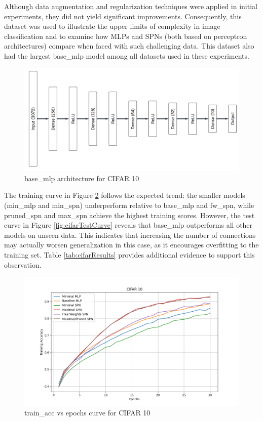 Although data augmentation and regularization techniques were applied in initial experiments, they did not yield significant improvements. Consequently, this dataset was used to illustrate the upper limits of complexity in image classification and to examine how MLPs and SPNs (both based on perceptron architectures) compare when faced with such challenging data. This dataset also had the largest base\_mlp model among all datasets used in these experiments.

\begin{figure}[H]
    \centering
    \includegraphics[width=1.0\textwidth]{Figures/Results/CIFAR_10/CIFAR_base_mlp_architecture.png} 
    \captionsetup{justification=centering}  %
    \caption{base\_mlp architecture for CIFAR 10}
    \label{fig:cifarMlpBaseArch}
\end{figure}

The training curve in Figure \ref{fig:cifarTrainCurve} follows the expected trend: the smaller models (min\_mlp and min\_spn) underperform relative to base\_mlp and fw\_spn, while pruned\_spn and max\_spn achieve the highest training scores. However, the test curve in Figure \ref{fig:cifarTestCurve} reveals that base\_mlp outperforms all other models on unseen data. This indicates that increasing the number of connections may actually worsen generalization in this case, as it encourages overfitting to the training set. Table \ref{tab:cifarResults} provides additional evidence to support this observation.

\begin{figure}[H]
    \centering
    \includegraphics[width=\linewidth]{Figures/Results/CIFAR_10/training_accuracy_plot.png} %
    \captionsetup{width=\linewidth}
    \caption{train\_acc vs epochs curve for CIFAR 10}
    \label{fig:cifarTrainCurve}
\end{figure}

